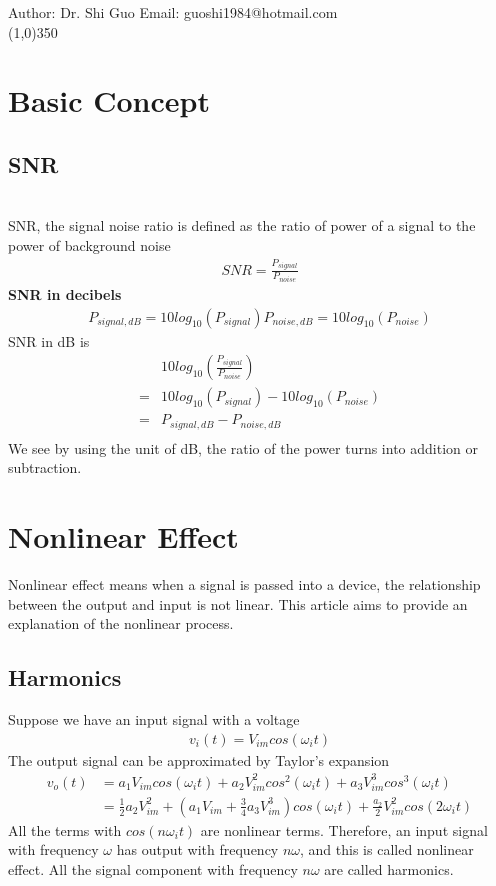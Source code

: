 \documentclass[a4paper]{article}
\begin{document}
Author: Dr. Shi Guo  \hspace{30mm} Email: guoshi1984@hotmail.com\\
\line(1,0){350}
\section{Basic Concept}
\subsection{SNR}\\
SNR, the signal noise ratio is defined as the ratio of power of a signal to the power of background noise
\begin{align*}
	SNR = \frac{P_{signal}}{P_{noise}}
\end{align*}
{\bf SNR in decibels}\\
\begin{align*}
	P_{signal,dB} = 10 log_{10}(P_{signal})
	P_{noise,dB} = 10 log_{10}(P_{noise})
\end{align*}
SNR in dB is 
\begin{align*}
   & 10 log_{10}(\frac{P_{signal}}{P_{noise}}) \\
 = & 10 log_{10}(P_{signal}) - 10 log_{10}(P_{noise}) \\
 = & P_{signal, dB} - P_{noise, dB}\\
\end{align*}
We see by using the unit of dB, the ratio of the power turns into addition or subtraction.
\section{Nonlinear Effect}
Nonlinear effect means when a signal is passed into a device, the relationship between the output and input is not linear. This article aims to provide an explanation of the nonlinear process.
\subsection{Harmonics}
Suppose we have an input signal with a voltage 
\begin{align*}
	v_i(t) = V_{im} cos (\omega_i t)
\end{align*}
The output  signal can be approximated by Taylor's expansion
\begin{align*}
	v_o(t) & = a_1 V_{im} cos(\omega_i t) + a_2 V^2_{im} cos^2(\omega_i t) + a_3 V^3_{im} cos^3(\omega_i t)\\
	     & = \frac{1}{2} a_2 V^2_{im} +(a_1 V_{im} + \frac{3}{4} a_3 V^3_{im}) cos(\omega_i t) + \frac{a_2}{2} V^2_{im} cos(2\omega_i t) 
\end{align*}
All the terms with $cos(n \omega_i t) $ are nonlinear terms. Therefore, an input signal with frequency $\omega$  has output with frequency $n \omega$, and this is called nonlinear effect. All the signal component with frequency $n \omega$ are called harmonics.
\end{document}
